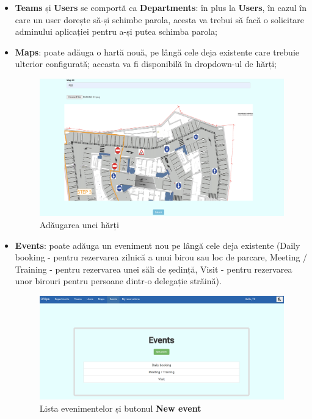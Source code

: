 \begin{itemize}[left=1.5cm]
    \item \textbf{Teams} și \textbf{Users} se comportă ca \textbf{Departments}: în plus la \textbf{Users}, în cazul în care un user dorește să-și schimbe parola, acesta va trebui să facă o solicitare adminului aplicației pentru a-și putea schimba parola;
    \item \textbf{Maps}: poate adăuga o hartă nouă, pe lângă cele deja existente care trebuie ulterior configurată; aceasta va fi disponibilă în dropdown-ul de hărți; 

    \begin{figure}[!htb]
        \centering
        \includegraphics[width=0.9\linewidth]{images/hartadeadaug.png}
        \caption{Adăugarea unei hărți}
        \label{fig:hartadeadaug}
    \end{figure}

    \item \textbf{Events}: poate adăuga un eveniment nou pe lângă cele deja existente (Daily booking - pentru rezervarea zilnică a unui birou sau loc de parcare, Meeting / Training - pentru rezervarea unei săli de ședință, Visit - pentru rezervarea unor birouri pentru persoane dintr-o delegație străină).

    \begin{figure}[!htb]
        \centering
        \includegraphics[width=0.9\linewidth]{images/events.png}
        \caption{Lista evenimentelor și butonul \textbf{New event}}
        \label{fig:events}
    \end{figure}
    
\end{itemize}

